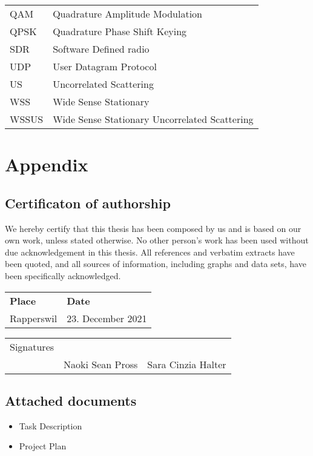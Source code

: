 \documentclass[
	overfullrule,
	paper = a4, twoside, openright, BCOR = 5mm,
	headinclude, footexclude,
	fontsize = 11pt,
	cleardoublepage = empty,
	titlepage, abstract = on,
	automark,
	numbers = noenddot
]{scrreprt}
\begin{document}
\begin{tabularx}{\linewidth}{l X}
		QAM    & Quadrature Amplitude Modulation                  \\
		QPSK   & Quadrature Phase Shift Keying                    \\
		SDR    & Software Defined radio                           \\
		UDP    & User Datagram Protocol                           \\
		US     & Uncorrelated Scattering                          \\
		WSS    & Wide Sense Stationary                            \\
		WSSUS  & Wide Sense Stationary Uncorrelated Scattering    \\
		\bottomrule
	\end{tabularx}

	\cleardoublepage

	\hypersetup{pageanchor = true}
	\setcounter{page}{1}
	\pagestyle{scrheadings}

	
	
	
	

	\printskelnotes
	\printbibliography

	\appendix
	\chapter{Appendix}

	\section{Certificaton of authorship}
	We hereby certify that this thesis has been composed by us and is based on our own work, unless stated otherwise. No other person's work has been used without due acknowledgement in this thesis. All references and verbatim extracts have been quoted, and all sources of information, including graphs and data sets, have been specifically acknowledged.

	\vspace{5mm}
	\begin{tabular}{ ll }
		\bfseries Place & \bfseries Date \\
		Rapperswil & 23. December 2021
	\end{tabular}
	\vspace{1cm}
	\begin{flushright}
		\begin{tabularx}{\linewidth}{ rXX }
			Signatures
				& \hrulefill & \hrulefill \\
				& Naoki Sean Pross & Sara Cinzia Halter \\
		\end{tabularx}
	\end{flushright}

  \section{Attached documents}
	\begin{itemize}
		\item Task Description
		\item Project Plan
	\end{itemize}
\end{document}
